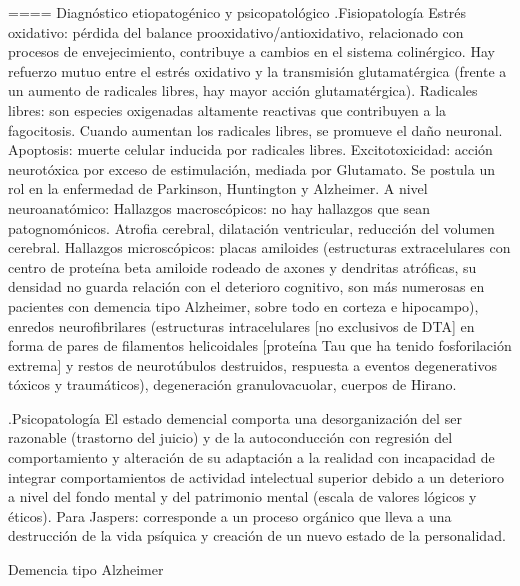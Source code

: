 \documentclass[encares.tex]{subfiles}
\begin{document}
==== Diagnóstico etiopatogénico y psicopatológico
.Fisiopatología
Estrés oxidativo: pérdida del balance prooxidativo/antioxidativo, relacionado con procesos de envejecimiento, contribuye a cambios en el sistema colinérgico. Hay refuerzo mutuo entre el estrés oxidativo y la transmisión glutamatérgica (frente a un aumento de radicales libres, hay mayor acción glutamatérgica). Radicales libres: son especies oxigenadas altamente reactivas que contribuyen a la fagocitosis. Cuando aumentan los radicales libres, se promueve el daño neuronal. Apoptosis: muerte celular inducida por radicales libres. Excitotoxicidad: acción neurotóxica por exceso de estimulación, mediada por Glutamato. Se postula un rol en la enfermedad de Parkinson, Huntington y Alzheimer. A nivel neuroanatómico: Hallazgos macroscópicos: no hay hallazgos que sean patognomónicos. Atrofia cerebral, dilatación ventricular, reducción del volumen cerebral. Hallazgos microscópicos: placas amiloides (estructuras extracelulares con centro de proteína beta amiloide rodeado de axones y dendritas atróficas, su densidad no guarda relación con el deterioro cognitivo, son más numerosas en pacientes con demencia tipo Alzheimer, sobre todo en corteza e hipocampo), enredos neurofibrilares (estructuras intracelulares [no exclusivos de DTA] en forma de pares de filamentos helicoidales [proteína Tau que ha tenido fosforilación extrema] y restos de neurotúbulos destruidos, respuesta a eventos degenerativos tóxicos y traumáticos), degeneración granulovacuolar, cuerpos de Hirano.

.Psicopatología
El estado demencial comporta una desorganización del ser razonable (trastorno del juicio) y de la autoconducción con regresión del comportamiento y alteración de su adaptación a la realidad con incapacidad de integrar comportamientos de actividad intelectual superior debido a un deterioro a nivel del fondo mental y del patrimonio mental (escala de valores lógicos y éticos). Para Jaspers: corresponde a un proceso orgánico que lleva a una destrucción de la vida psíquica y creación de un nuevo estado de la personalidad.

Demencia tipo Alzheimer
\end{document}
